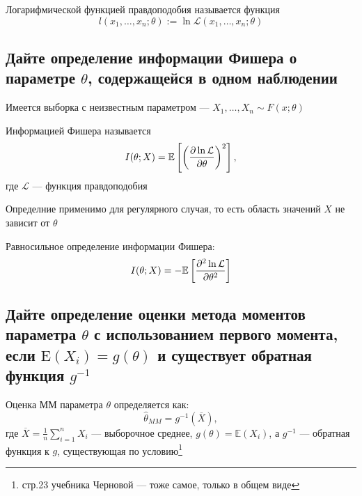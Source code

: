 \documentclass{article}
\begin{document}

 Логарифмической функцией правдоподобия называется функция
\begin{equation*}
    l\left(x_{1}, \ldots, x_{n} ; \theta\right):=\ln \mathcal{L}\left(x_{1}, \ldots, x_{n} ; \theta\right)
\end{equation*}

\subsection{Дайте определение информации Фишера о параметре $\theta$, содержащейся в одном наблюдении}
Имеется выборка с неизвестным параметром — $X_1,\ldots,X_n\sim F(x;\theta)$

 Информацией Фишера называется 
\begin{equation*}
    I(\theta;X)=\mathbb{E}\left[\left(\frac{\partial \ln\mathcal{L}}{\partial\theta}\right)^2\right],
\end{equation*}
где $\mathcal{L}$ — функция правдоподобия

\comment Определние применимо для регулярного случая, то есть область значений $X$ не зависит от $\theta$

 Равносильное определение информации Фишера:
\begin{equation*}
    I(\theta;X)=-\mathbb{E}\left[\frac{\partial^2\ln\mathcal{L}}{\partial\theta^2}\right]
\end{equation*}

\subsection{Дайте определение оценки метода моментов параметра $\theta$ с использованием первого момента, если $\mathrm{E}\left(X_{i}\right)=g(\theta)$ и существует обратная функция $g^{-1}$}
Оценка ММ параметра $\theta$ определяется как:
\begin{equation*}
    \hat{\theta}_{MM} = g^{-1}\left( \overline{X} \right),
\end{equation*}
где $\overline{X} = \frac{1}{n} \sum_{i=1}^n X_i$ — выборочное среднее, $g(\theta) = \mathbb{E}(X_i)$, а $g^{-1}$ — обратная функция к $g$, существующая по условию\footnote{стр.23 учебника Черновой — тоже самое, только в общем виде}
\end{document}
